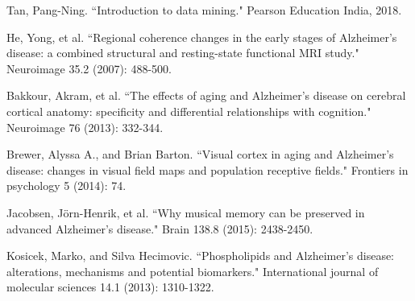 \documentclass[journal]{IEEEtran}
\begin{document}
\begin{thebibliography}{1}
		
%		
		
		
		Tan, Pang-Ning. ``Introduction to data mining." Pearson Education India, 2018.
		
		
		
		
		
		
		
		
		
		He, Yong, et al. ``Regional coherence changes in the early stages of Alzheimer’s disease: a combined structural and resting-state functional MRI study." Neuroimage 35.2 (2007): 488-500.
		
		
		
		Bakkour, Akram, et al. ``The effects of aging and Alzheimer's disease on cerebral cortical anatomy: specificity and differential relationships with cognition." Neuroimage 76 (2013): 332-344.
		
		Brewer, Alyssa A., and Brian Barton. ``Visual cortex in aging and Alzheimer's disease: changes in visual field maps and population receptive fields." Frontiers in psychology 5 (2014): 74.
		
		Jacobsen, Jörn-Henrik, et al. ``Why musical memory can be preserved in advanced Alzheimer’s disease." Brain 138.8 (2015): 2438-2450.
		
		Kosicek, Marko, and Silva Hecimovic. ``Phospholipids and Alzheimer’s disease: alterations, mechanisms and potential biomarkers." International journal of molecular sciences 14.1 (2013): 1310-1322.
		

\end{thebibliography}
\end{document}
